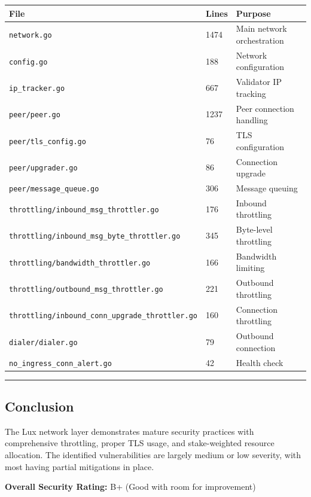 \documentclass[
]{article}
\newcounter{none} %
\begin{document}
{\def\LTcaptype{none} %
\begin{longtable}[]{@{}lll@{}}
\toprule\noalign{}
File & Lines & Purpose \\
\midrule\noalign{}
\endhead
\bottomrule\noalign{}
\endlastfoot
\texttt{network.go} & 1474 & Main network orchestration \\
\texttt{config.go} & 188 & Network configuration \\
\texttt{ip\_tracker.go} & 667 & Validator IP tracking \\
\texttt{peer/peer.go} & 1237 & Peer connection handling \\
\texttt{peer/tls\_config.go} & 76 & TLS configuration \\
\texttt{peer/upgrader.go} & 86 & Connection upgrade \\
\texttt{peer/message\_queue.go} & 306 & Message queuing \\
\texttt{throttling/inbound\_msg\_throttler.go} & 176 & Inbound
throttling \\
\texttt{throttling/inbound\_msg\_byte\_throttler.go} & 345 & Byte-level
throttling \\
\texttt{throttling/bandwidth\_throttler.go} & 166 & Bandwidth
limiting \\
\texttt{throttling/outbound\_msg\_throttler.go} & 221 & Outbound
throttling \\
\texttt{throttling/inbound\_conn\_upgrade\_throttler.go} & 160 &
Connection throttling \\
\texttt{dialer/dialer.go} & 79 & Outbound connection \\
\texttt{no\_ingress\_conn\_alert.go} & 42 & Health check \\
\end{longtable}
}

\begin{center}\rule{0.5\linewidth}{0.5pt}\end{center}

\subsection{Conclusion}\label{conclusion}

The Lux network layer demonstrates mature security practices with
comprehensive throttling, proper TLS usage, and stake-weighted resource
allocation. The identified vulnerabilities are largely medium or low
severity, with most having partial mitigations in place.

\textbf{Overall Security Rating:} B+ (Good with room for improvement)
\end{document}
